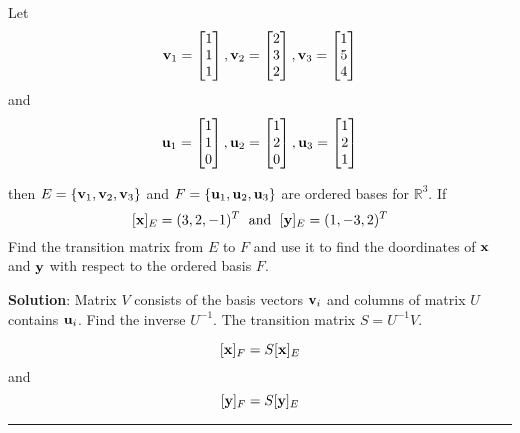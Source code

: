\begin{example}
	Let
	\[ {\bf v}_1 =  \begin{bmatrix}  1 \\ 1 \\1  \end{bmatrix},  {\bf v}_2 =  \begin{bmatrix}  2 \\ 3 \\2  \end{bmatrix},  {\bf v}_3 =  \begin{bmatrix}  1 \\ 5 \\ 4  \end{bmatrix}  \]
	and
	\[ {\bf u}_1 =  \begin{bmatrix}  1 \\ 1 \\0  \end{bmatrix},  {\bf u}_2 =  \begin{bmatrix}  1 \\ 2 \\ 0  \end{bmatrix},  {\bf u}_3 =  \begin{bmatrix}  1 \\ 2 \\ 1  \end{bmatrix}  \]
	
	then $E = \{ {\bf v}_1, {\bf v}_2, {\bf v}_3 \}$ and $F =  \{ {\bf u}_1, {\bf u}_2, {\bf u}_3 \}$ are ordered bases for  $\mathbb{R}^3$.  If 
	\[ [{\bf x}]_E = (3, 2, -1)^T  \; \text{ and } \;  [{\bf y}]_E = (1, -3, 2)^T \]
	Find the transition matrix from $E$ to $F$ and use it to find the doordinates of ${\bf x}$ and ${\bf y}$ with respect to the ordered basis $F$.  
	
	
	
	\textbf{Solution}:  Matrix $V$ consists of the basis vectors ${\bf v}_i$ and columns of matrix $U$ contains ${\bf u}_i$.  Find the inverse $U^{-1}$.  The transition matrix $S = U^{-1} V$.  
	
	\[  [{\bf x}]_F = S [{\bf x}]_E \]
	and 
	\[  [{\bf y}]_F = S [{\bf y}]_E \]
	
	
\end{example}







\rule[0.01in]{\textwidth}{0.0025in}






